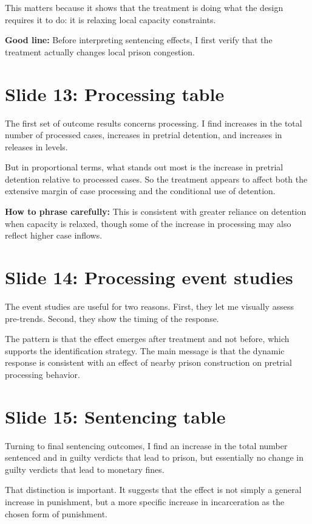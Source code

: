 \documentclass[11pt]{article}
\begin{document}
This matters because it shows that the treatment is doing what the design requires it to do: it is relaxing local capacity constraints.

\textbf{Good line:}
Before interpreting sentencing effects, I first verify that the treatment actually changes local prison congestion.

\section{Slide 13: Processing table}
The first set of outcome results concerns processing. I find increases in the total number of processed cases, increases in pretrial detention, and increases in releases in levels.

But in proportional terms, what stands out most is the increase in pretrial detention relative to processed cases. So the treatment appears to affect both the extensive margin of case processing and the conditional use of detention.

\textbf{How to phrase carefully:}
This is consistent with greater reliance on detention when capacity is relaxed, though some of the increase in processing may also reflect higher case inflows.

\section{Slide 14: Processing event studies}
The event studies are useful for two reasons. First, they let me visually assess pre-trends. Second, they show the timing of the response.

The pattern is that the effect emerges after treatment and not before, which supports the identification strategy. The main message is that the dynamic response is consistent with an effect of nearby prison construction on pretrial processing behavior.

\section{Slide 15: Sentencing table}
Turning to final sentencing outcomes, I find an increase in the total number sentenced and in guilty verdicts that lead to prison, but essentially no change in guilty verdicts that lead to monetary fines.

That distinction is important. It suggests that the effect is not simply a general increase in punishment, but a more specific increase in incarceration as the chosen form of punishment.
\end{document}
